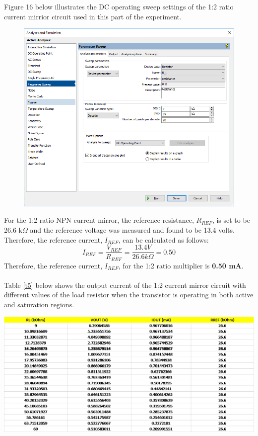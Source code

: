 \documentclass{article}
\begin{document}
	\noindent Figure 16 below illustrates the DC operating sweep settings of the 1:2 ratio current mirrior circuit used in this part of the experiment.
	\begin{figure}[!ht]
		\centering
		\includegraphics[width=0.62\linewidth]{d1-part3.1-DcOperatingSweep.png}
		\label{f16}
	\end{figure}
	
	\pagebreak
	
	\noindent For the 1:2 ratio NPN current mirror, the reference resistance, $R_{REF}$, is set to be 26.6 k$\Omega$ and the reference voltage was measured and found to be 13.4 volts.
	Therefore, the reference current, $I_{REF}$, can be calculated as follows: $$I_{REF} = \frac{V_{REF}}{R_{REF}} = \frac{13.4 V}{26.6 k\Omega} = 0.50$$
	Therefore, the reference current, $I_{REF}$, for the 1:2 ratio multiplier is \textbf{0.50 mA}.\\\\
	Table \ref{t5} below shows the output current of the 1:2 current mirror circuit with different values of the load resistor when the transistor is operating in both active and saturation regions.
	\begin{table}[!ht]
		\centering
		\label{t5}
		\includegraphics[width=\linewidth]{part3-data-measured-npn-1_2.png}
	\end{table}
	
\end{document}
